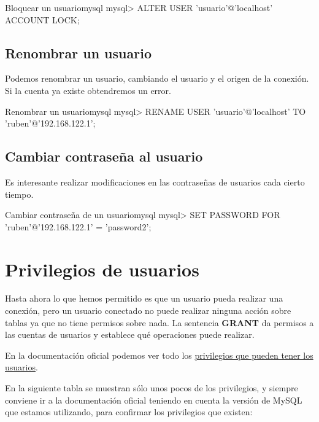 \begin{mycode}{Bloquear un usuario}{mysql}{}
mysql> ALTER USER 'usuario'@'localhost' ACCOUNT LOCK;
\end{mycode}


\subsection{Renombrar un usuario}
Podemos renombrar un usuario, cambiando el usuario y el origen de la conexión. Si la cuenta ya existe obtendremos un error.

\begin{mycode}{Renombrar un usuario}{mysql}{}
mysql> RENAME USER 'usuario'@'localhost' TO 'ruben'@'192.168.122.1';
\end{mycode}


\subsection{Cambiar contraseña al usuario}
Es interesante realizar modificaciones en las contraseñas de usuarios cada cierto tiempo.

\begin{mycode}{Cambiar contraseña de un usuario}{mysql}{}
mysql> SET PASSWORD FOR 'ruben'@'192.168.122.1' = 'password2';
\end{mycode}

\section{Privilegios de usuarios}
Hasta ahora lo que hemos permitido es que un usuario pueda realizar una conexión, pero un usuario conectado no puede realizar ninguna acción sobre tablas ya que no tiene permisos sobre nada. La sentencia \textbf{GRANT} da permisos a las cuentas de usuarios y establece qué operaciones puede realizar.

En la documentación oficial podemos ver todo los \href{https://dev.mysql.com/doc/refman/8.0/en/privileges-provided.html}{privilegios que pueden tener los usuarios}.

En la siguiente tabla se muestran sólo unos pocos de los privilegios, y siempre conviene ir a la documentación oficial teniendo en cuenta la versión de MySQL que estamos utilizando, para confirmar los privilegios que existen:



